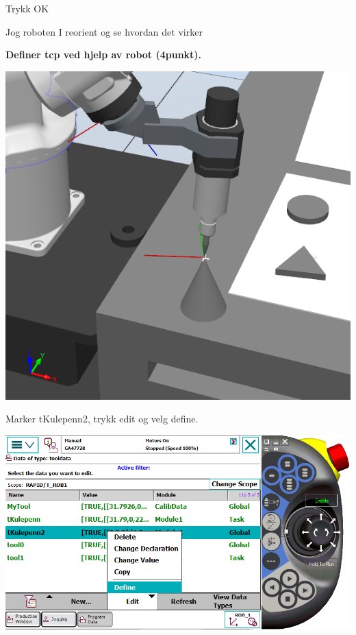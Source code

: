Trykk OK

Jog roboten I reorient og se hvordan det virker

\vspace{1cm}


\textbf{Definer tcp ved hjelp av robot (4punkt).}

\vspace{1cm}

\includegraphics[width=1\textwidth]{i04861x10}

\vspace{1cm}

Marker tKulepenn2, trykk edit og velg define.

\vspace{1cm}

\includegraphics[width=1\textwidth]{i04861x11}

